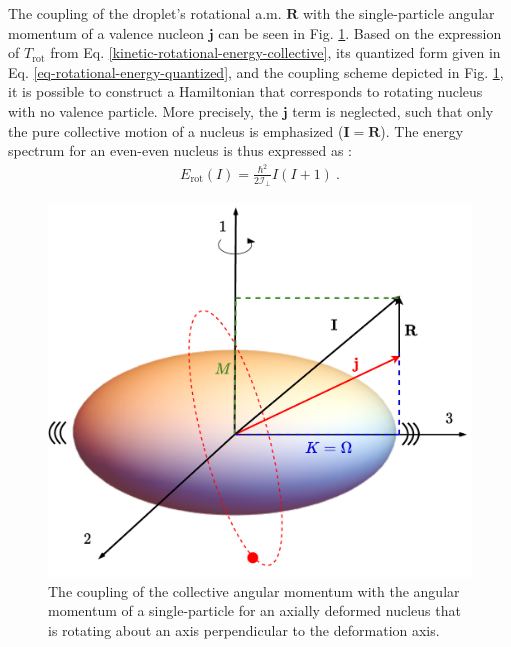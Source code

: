 The coupling of the droplet's rotational a.m. $\mathbf{R}$ with the single-particle angular momentum of a valence nucleon $\mathbf{j}$ can be seen in Fig. \ref{rotational-coupling-schematic}. Based on the expression of $T_\text{rot}$ from Eq. \ref{kinetic-rotational-energy-collective}, its quantized form given in Eq. \ref{eq-rotational-energy-quantized}, and the coupling scheme depicted in Fig. \ref{rotational-coupling-schematic}, it is possible to construct a Hamiltonian that corresponds to rotating nucleus with no valence particle. More precisely, the $\mathbf{j}$ term is neglected, such that only the pure collective motion of a nucleus is emphasized ($\mathbf{I}=\mathbf{R}$). The energy spectrum for an even-even nucleus is thus expressed as \cite{davydov1958rotational}:
\begin{align}
    E_\text{rot}(I)=\frac{\hbar^2}{2\mathcal{I}_\perp}I(I+1)\ .
    \label{eq-simple-rotor-spectrum}
\end{align}
\begin{figure}
    \centering
    \includegraphics[scale=0.6]{Chapters/Figures/SCHEMATIC_COUPLING_ROTATIONAL.pdf}
    \caption{The coupling of the collective angular momentum with the angular momentum of a single-particle for an axially deformed nucleus that is rotating about an axis perpendicular to the deformation axis.}
    \label{rotational-coupling-schematic}
\end{figure}

